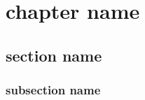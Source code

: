 


\usepackage{imakeidx}
    \makeindex
    \makeindex[name=symbol,title=Symbols,columns=3]
\usepackage{glossaries}
\makeglossaries
\usepackage{nomencl}
\makenomenclature
\usepackage{lipsum}
\usepackage{placeins}





\newcommand{\M}{\mathbb{M}}
\newcommand{\K}[2][]{\sideset{#2}{#1}K}
\newcommand{\nerve}{\mathcal {N}}

\title{}
\author{}
\date{}



\maketitle

\begin{spacing}{1}
\tableofcontents
\end{spacing}

    \chapter{chapter name}
    \label{cha:chapter_name}
    \section{section name}
    \label{sec:section_name}
    \subsection{subsection name}
    \label{sub:subsection_name}
    
    
    

   
   
   
    
    

\printglossaries
\printnomenclature
\newpage


\newpage
\printindex[symbol]
\printindex

